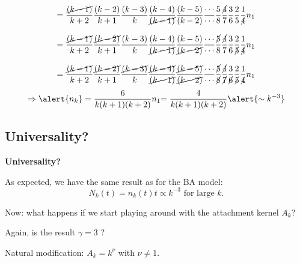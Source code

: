 \begin{frame}[label=]
\begin{frame}[label=]
\begin{frame}[label=]
\begin{frame}[label=]
\begin{frame}[label=]
\begin{frame}[label=]
\begin{frame}[label=]
\begin{frame}[label=]
\begin{frame}[label=]
\begin{frame}[label=]
\begin{frame}[label=]
\begin{frame}[label=]
\begin{frame}[label=]
\begin{frame}[label=]
\begin{frame}[label=]
\begin{frame}[label=]
\begin{frame}[label=]
\begin{frame}[label=]
\begin{frame}[label=]
\begin{frame}[label=]
\begin{frame}[label=]
\begin{frame}[label=]
\begin{frame}[label=]
\begin{frame}[label=]
\begin{overprint}
      $$
      =
      \frac{\cancel{(k-1)}}{k+2} 
      \frac{(k-2)}{k+1} 
      \frac{(k-3)}{k} 
      \frac{(k-4)}{\cancel{(k-1)}}
      \frac{(k-5)}{(k-2)} 
      \frac{\cdots}{\cdots}
      \frac{5}{8}
      \frac{\cancel{4}}{7}
      \frac{3}{6}
      \frac{2}{5}
      \frac{1}{\cancel{4}}
      n_1
      $$
      
      $$
      =
      \frac{\cancel{(k-1)}}{k+2} 
      \frac{\cancel{(k-2)}}{k+1} 
      \frac{{(k-3)}}{k} 
      \frac{{(k-4)}}{\cancel{(k-1)}}
      \frac{{(k-5)}}{\cancel{(k-2)}}
      \frac{\cdots}{\cdots}
      \frac{\cancel{5}}{{8}}
      \frac{\cancel{4}}{{7}}
      \frac{3}{{6}}
      \frac{2}{\cancel{5}}
      \frac{1}{\cancel{4}}
      n_1
      $$
      
      $$
      =
      \frac{\cancel{(k-1)}}{k+2} 
      \frac{\cancel{(k-2)}}{k+1} 
      \frac{\cancel{(k-3)}}{k} 
      \frac{\cancel{(k-4)}}{\cancel{(k-1)}}
      \frac{\cancel{(k-5)}}{\cancel{(k-2)}}
      \frac{\cdots}{\cdots}
      \frac{\cancel{5}}{\cancel{8}}
      \frac{\cancel{4}}{\cancel{7}}
      \frac{3}{\cancel{6}}
      \frac{2}{\cancel{5}}
      \frac{1}{\cancel{4}}
      n_1
      $$
        $$
    {
      \Rightarrow \alert{n_k} = 
      \frac{6}{k(k+1)(k+2)} n_1
    }
    {
      =
      \frac{4}{k(k+1)(k+2)}
    }
    {
      \alert{\sim k^{-3}}
    }
    $$
    
  

\subsection{Universality?}

  \textbf{Universality?}

  
  
    As expected, we have the same result as for the BA model:
    $$
    N_k(t) = n_k(t) t \propto k^{-3} \mbox{\ for large $k$}.
    $$
  
    Now: what happens if we start playing around with 
    the attachment kernel $A_k$?
  
    Again, is the result $\gamma=3$
    ?
  
    Natural modification: $A_k = k^\nu$ with $\nu \ne 1$.
  

\end{overprint}
\end{frame}
\end{frame}
\end{frame}
\end{frame}
\end{frame}
\end{frame}
\end{frame}
\end{frame}
\end{frame}
\end{frame}
\end{frame}
\end{frame}
\end{frame}
\end{frame}
\end{frame}
\end{frame}
\end{frame}
\end{frame}
\end{frame}
\end{frame}
\end{frame}
\end{frame}
\end{frame}
\end{frame}
